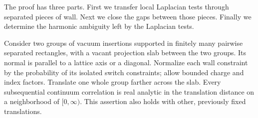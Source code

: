 The proof has three parts.  First we transfer local Laplacian tests
through separated pieces of wall.  Next we close the gaps between
those pieces.  Finally we determine the harmonic ambiguity left by
the Laplacian tests.

\begin{lemma}
\label{q4field:analytic-displacement}
Consider two groups of vacuum insertions supported in finitely many
pairwise separated rectangles, with a vacant projection slab between
the two groups.  Its normal is parallel to a lattice axis or a
diagonal.  Normalize each wall constraint by the probability of its
isolated switch constraints; allow bounded charge and index factors.
Translate one whole group farther across the slab.  Every
subsequential continuum correlation is real analytic in the
translation distance on a neighborhood of $[0,\infty)$.
This assertion also holds with other, previously fixed translations.
\end{lemma}

